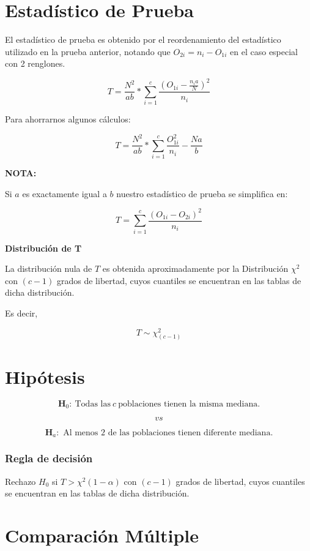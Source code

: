 \documentclass[
  a4paper,
  oneside,
  openany]{book}
\begin{document}
\hypertarget{estaduxedstico-de-prueba-12}{%
\section{Estadístico de Prueba}\label{estaduxedstico-de-prueba-12}}

El estadístico de prueba es obtenido por el reordenamiento del estadístico utilizado en la prueba anterior, notando que \(O_{2i}=n_{i}-O_{1i}\) en el caso especial con 2 renglones.

\[T=\frac{N^2}{ab}*\sum^{c}_{i=1}\frac{(O_{1i}-\frac{n_{i}a}{N})^2}{n_i}\]

Para ahorrarnos algunos cálculos:

\[T=\frac{N^2}{ab}*\sum^{c}_{i=1}\frac{O_{1i}^2}{n_i}-\frac{Na}{b}\]

\textbf{NOTA:}

Si \(a\) es exactamente igual a \(b\) nuestro estadístico de prueba se simplifica en:

\[T=\sum^{c}_{i=1}\frac{(O_{1i}-O_{2i})^2}{n_i}\]

\textbf{Distribución de T}

La distribución nula de \(T\) es obtenida aproximadamente por la Distribución \(\chi^2\) con \((c-1)\) grados de libertad, cuyos cuantiles se encuentran en las tablas de dicha distribución.

Es decir,

\[T\sim \chi^2_{(c-1)}\]

\hypertarget{hipuxf3tesis-12}{%
\section{Hipótesis}\label{hipuxf3tesis-12}}

\[\textbf{H}_0: \ \mbox{Todas las} \  c \  \mbox{poblaciones tienen la misma mediana.}\]

\[vs\]

\[\textbf{H}_a:\mbox{ Al menos 2 de las poblaciones tienen diferente mediana.}\]

\hypertarget{regla-de-decisiuxf3n-26}{%
\subsubsection*{Regla de decisión}\label{regla-de-decisiuxf3n-26}}


Rechazo \(H_0\) si \(T> \chi^2(1-\alpha)\) con \((c-1)\) grados de libertad, cuyos cuantiles se encuentran en las tablas de dicha distribución.

\hypertarget{comparaciuxf3n-muxfaltiple-1}{%
\section{Comparación Múltiple}\label{comparaciuxf3n-muxfaltiple-1}}
\end{document}
